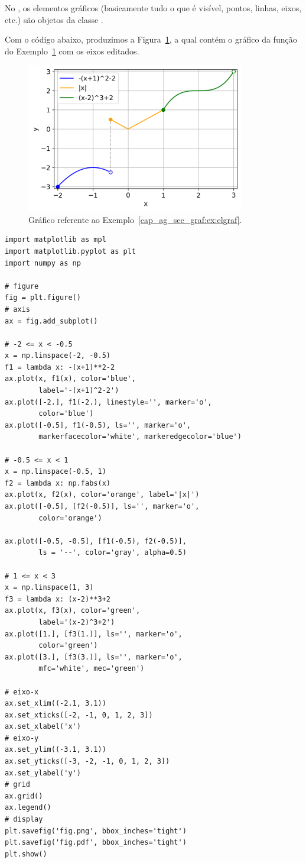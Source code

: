 No {\PYTHONmatplotlib}, os elementos gráficos (basicamente tudo o que é visível, pontos, linhas, eixos, etc.) são objetos da classe {\PYTHONmatplotlibDOTartistDOTArtist}.

\begin{ex}\label{cap_ag_sec_graf:ex:elgraf}
  Com o código abaixo, produzimos a Figura~\ref{cap_ag_sec_graf:fig:elgraf}, a qual contém o gráfico da função do Exemplo~\ref{cap_ag_sec_graf:fig:elgraf} com os eixos editados.

  \begin{figure}[H]
    \centering
    \includegraphics[width=3.75in]{./cap_ag/dados/fig_elgraf/fig.png}
    \caption{Gráfico referente ao Exemplo~\ref{cap_ag_sec_graf:ex:elgraf}.}
    \label{cap_ag_sec_graf:fig:elgraf}
  \end{figure}
  
\begin{lstlisting}
import matplotlib as mpl
import matplotlib.pyplot as plt
import numpy as np

# figure
fig = plt.figure()
# axis
ax = fig.add_subplot()

# -2 <= x < -0.5
x = np.linspace(-2, -0.5)
f1 = lambda x: -(x+1)**2-2
ax.plot(x, f1(x), color='blue',
        label='-(x+1)^2-2')
ax.plot([-2.], f1(-2.), linestyle='', marker='o',
        color='blue')
ax.plot([-0.5], f1(-0.5), ls='', marker='o',
        markerfacecolor='white', markeredgecolor='blue')

# -0.5 <= x < 1
x = np.linspace(-0.5, 1)
f2 = lambda x: np.fabs(x)
ax.plot(x, f2(x), color='orange', label='|x|')
ax.plot([-0.5], [f2(-0.5)], ls='', marker='o',
        color='orange')

ax.plot([-0.5, -0.5], [f1(-0.5), f2(-0.5)],
        ls = '--', color='gray', alpha=0.5)

# 1 <= x < 3
x = np.linspace(1, 3)
f3 = lambda x: (x-2)**3+2
ax.plot(x, f3(x), color='green',
        label='(x-2)^3+2')
ax.plot([1.], [f3(1.)], ls='', marker='o',
        color='green')
ax.plot([3.], [f3(3.)], ls='', marker='o',
        mfc='white', mec='green')

# eixo-x
ax.set_xlim((-2.1, 3.1))
ax.set_xticks([-2, -1, 0, 1, 2, 3])
ax.set_xlabel('x')
# eixo-y
ax.set_ylim((-3.1, 3.1))
ax.set_yticks([-3, -2, -1, 0, 1, 2, 3])
ax.set_ylabel('y')
# grid
ax.grid()
ax.legend()
# display
plt.savefig('fig.png', bbox_inches='tight')
plt.savefig('fig.pdf', bbox_inches='tight')
plt.show()
\end{lstlisting}

\end{ex}

